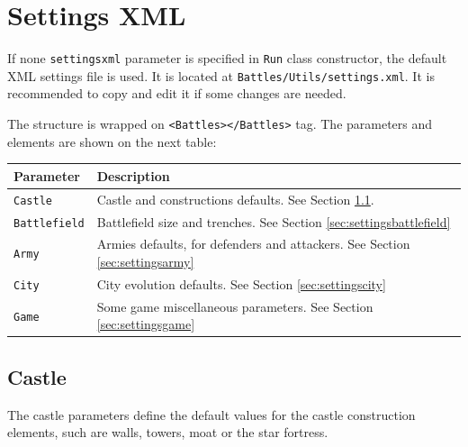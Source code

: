 \documentclass[tog]{acmsiggraph}
\begin{document}
\section{Settings XML}

If none \texttt{settingsxml} parameter is specified in \texttt{Run} class constructor, the default XML settings file is used.
It is located at \texttt{Battles/Utils/settings.xml}.
It is recommended to copy and edit it if some changes are needed. 

The structure is wrapped on \texttt{<Battles></Battles>} tag.
The parameters and elements are shown on the next table:

\begin{tabularx}{0.48\textwidth}{ |l|X| }
\hline 
\textbf{Parameter} & \textbf{Description} \\[0.15cm]
 \hline
 \texttt{Castle} & Castle and constructions defaults. See Section \ref{sec:settingscastle}. \\
 \hline
 \texttt{Battlefield} & Battlefield size and trenches. See Section \ref{sec:settingsbattlefield} \\
 \hline
 \texttt{Army} & Armies defaults, for defenders and attackers. See Section \ref{sec:settingsarmy} \\
 \hline
 \texttt{City} & City evolution defaults. See Section \ref{sec:settingscity} \\
 \hline
 \texttt{Game} & Some game miscellaneous parameters. See Section \ref{sec:settingsgame} \\
 \hline
\end{tabularx} 



\subsection{Castle}
\label{sec:settingscastle}

The castle parameters define the default values for the castle construction elements, such are walls, towers, moat or the star fortress.
\end{document}

